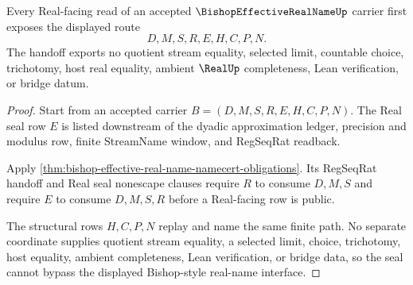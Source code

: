 \begin{theorem}
\label{thm:bishop-effective-real-name-real-seal-handoff}
Every Real-facing read of an accepted $\BishopEffectiveRealNameUp$ carrier first exposes the displayed route
$$
D,M,S,R,E,H,C,P,N .
$$
The handoff exports no quotient stream equality, selected limit, countable choice, trichotomy, host real equality, ambient $\RealUp$ completeness, Lean verification, or bridge datum.
\end{theorem}
\begin{proof}
Start from an accepted carrier $B=(D,M,S,R,E,H,C,P,N)$. The Real seal row $E$ is listed downstream of the dyadic approximation ledger, precision and modulus row, finite StreamName window, and RegSeqRat readback.

Apply \autoref{thm:bishop-effective-real-name-namecert-obligations}. Its RegSeqRat handoff and Real seal nonescape clauses require $R$ to consume $D,M,S$ and require $E$ to consume $D,M,S,R$ before a Real-facing row is public.

The structural rows $H,C,P,N$ replay and name the same finite path. No separate coordinate supplies quotient stream equality, a selected limit, choice, trichotomy, host equality, ambient completeness, Lean verification, or bridge data, so the seal cannot bypass the displayed Bishop-style real-name interface.
\end{proof}




